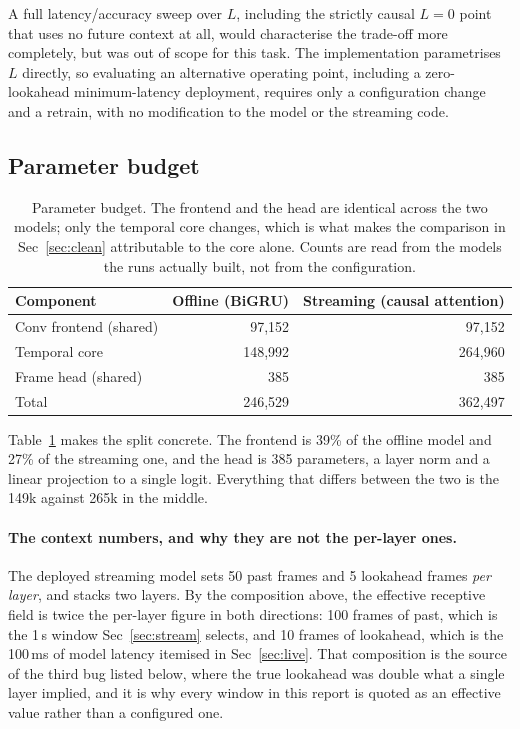 \documentclass{article}
\begin{document}
A full latency/accuracy sweep over $L$, including the strictly causal $L=0$ point that uses no future context at all, would characterise the trade-off more completely, but was
out of scope for this task. The implementation parametrises $L$ directly, so evaluating an
alternative operating point, including a zero-lookahead minimum-latency deployment,
requires only a configuration change and a retrain, with no modification to the model or
the streaming code.

\subsection{Parameter budget}

\begin{table}[H]
    \centering
    \caption{Parameter budget. The frontend and the head are identical across the two
    models; only the temporal core changes, which is what makes the comparison in
    Sec~\ref{sec:clean} attributable to the core alone. Counts are read from the models
    the runs actually built, not from the configuration.}
    \label{tab:params}
    \small
    \begin{tabular}{lrr}
        \toprule
        Component & Offline (BiGRU) & Streaming (causal attention) \\
        \midrule
        Conv frontend (shared) & 97{,}152 & 97{,}152 \\
        Temporal core          & 148{,}992 & 264{,}960 \\
        Frame head (shared)    & 385 & 385 \\
        \midrule
        Total                  & 246{,}529 & 362{,}497 \\
        \bottomrule
    \end{tabular}
\end{table}

Table~\ref{tab:params} makes the split concrete. The frontend is 39\% of the offline
model and 27\% of the streaming one, and the head is 385 parameters, a layer norm and a
linear projection to a single logit. Everything that differs between the two is the
149k against 265k in the middle.

\paragraph{The context numbers, and why they are not the per-layer ones.} The deployed
streaming model sets 50 past frames and 5 lookahead frames \emph{per layer}, and stacks
two layers. By the composition above, the effective receptive field is twice the per-layer
figure in both directions: 100 frames of past, which is the 1\,s window
Sec~\ref{sec:stream} selects, and 10 frames of lookahead, which is the 100\,ms of model
latency itemised in Sec~\ref{sec:live}. That composition is the source of the third bug listed below, where the true lookahead was double what a single layer implied, and it is
why every window in this report is quoted as an effective value rather than a configured
one.
\end{document}
